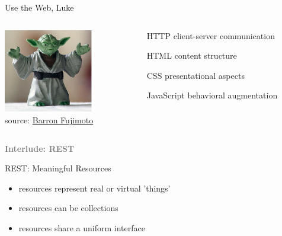 \documentclass{beamer}
\begin{document}
\begin{frame}{Use the Web, Luke}
  \begin{columns}
    \begin{column}{4.0cm}
      \includegraphics[width=4cm]{images/yoda.png}
      \\
      \tiny source: \href{http://www.flickr.com/photos/barron/15483113/}{Barron Fujimoto}
    \end{column}

    \begin{column}{5.5cm}
      \begin{itemize}
        \item[HTTP] client-server communication
        \item[HTML] content structure
        \item[CSS] presentational aspects
        \item[JavaScript] behavioral augmentation
      \end{itemize}
    \end{column}
  \end{columns}
\end{frame}

\begin{frame}
  \vspace*{-1cm}
  \textcolor{gray}{
    \begin{center}
      \textbf{
        \fontsize{60}{60}\selectfont Interlude: REST
      }
    \end{center}
  }
\end{frame}

\begin{frame}{REST: Meaningful Resources}
  \begin{itemize}
    \item resources represent real or virtual 'things'
    \item resources can be collections
    \item resources share a uniform interface
  \end{itemize}
\end{frame}
\end{document}

